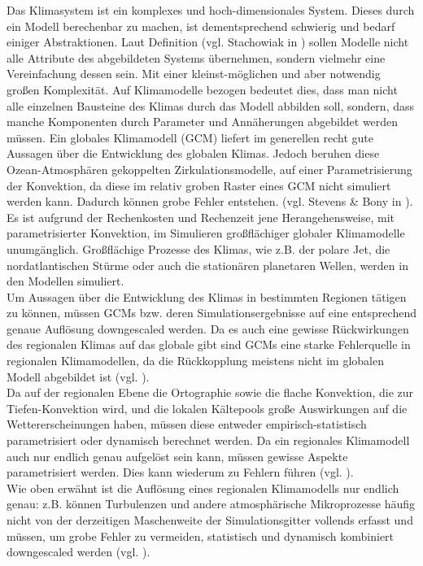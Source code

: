Das Klimasystem ist ein komplexes und hoch-dimensionales System. Dieses durch ein Modell berechenbar zu machen, ist dementsprechend schwierig und bedarf einiger Abstraktionen. Laut Definition (vgl. Stachowiak in \cite{stachowiak}) sollen Modelle nicht alle Attribute des abgebildeten Systems übernehmen, sondern vielmehr eine Vereinfachung dessen sein. Mit einer kleinst-möglichen und aber notwendig großen Komplexität. Auf Klimamodelle bezogen bedeutet dies, dass man nicht alle einzelnen Bausteine des Klimas durch das Modell abbilden soll, sondern, dass manche Komponenten durch Parameter und Annäherungen abgebildet werden müssen. Ein globales Klimamodell (GCM) liefert im generellen recht gute Aussagen über die Entwicklung des globalen Klimas. Jedoch beruhen diese Ozean-Atmosphären gekoppelten Zirkulationsmodelle, auf einer Parametrisierung der Konvektion, da diese im relativ groben Raster eines GCM nicht simuliert werden kann. Dadurch können grobe Fehler entstehen. (vgl. Stevens \& Bony in \cite{stevensbony}). Es ist aufgrund der Rechenkosten und Rechenzeit jene Herangehensweise, mit parametrisierter Konvektion, im Simulieren großflächiger globaler Klimamodelle  unumgänglich. Großflächige Prozesse des Klimas, wie z.B. der polare Jet, die nordatlantischen Stürme oder auch die stationären planetaren Wellen, werden in den Modellen simuliert.\\
Um Aussagen über die Entwicklung des Klimas in bestimmten Regionen tätigen zu können, müssen GCMs bzw. deren Simulationsergebnisse auf eine entsprechend genaue Auflösung downgescaled werden. Da es auch eine gewisse Rückwirkungen des regionalen Klimas auf das globale gibt sind GCMs eine starke Fehlerquelle in regionalen Klimamodellen, da die Rückkopplung meistens nicht im globalen Modell abgebildet ist (vgl. \cite{woollings_2013}).\\
Da auf der regionalen Ebene die Ortographie sowie die flache Konvektion, die zur Tiefen-Konvektion wird, und die lokalen Kältepools große Auswirkungen auf die Wettererscheinungen haben, müssen diese entweder empirisch-statistisch parametrisiert oder dynamisch berechnet werden. Da ein regionales Klimamodell auch nur endlich genau aufgelöst sein kann, müssen gewisse Aspekte parametrisiert werden. Dies kann wiederum zu Fehlern führen (vgl. \cite{maraun_2010,casanueva_2013}).\\
Wie oben erwähnt ist die Auflösung eines regionalen Klimamodells nur endlich genau: z.B. können Turbulenzen und andere atmosphärische Mikroprozesse häufig nicht von der derzeitigen Maschenweite der Simulationsgitter vollends erfasst und müssen, um grobe Fehler zu vermeiden, statistisch und dynamisch kombiniert downgescaled werden (vgl. \cite{marauntowards}).\\
